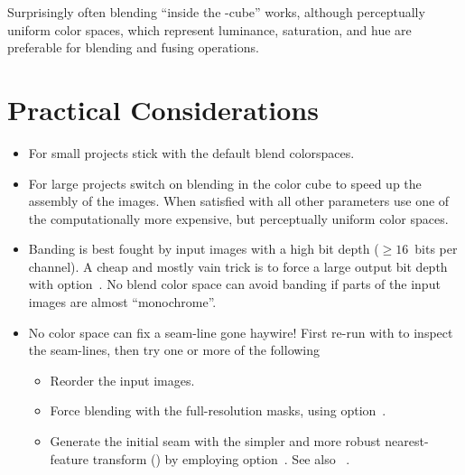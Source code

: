 \noindent Surprisingly often blending ``inside the -cube'' works, although
perceptually uniform color spaces, which represent luminance, saturation, and hue are preferable
for blending and fusing operations.


\section[Practical Considerations]{\label{sec:practical-considerations}%
  Practical Considerations}

\begin{itemize}
\item
  For small projects stick with the default blend colorspaces.

\item
  For large projects switch on blending in the  color cube to speed up the assembly
  of the images.  When satisfied with all other parameters use one of the computationally more
  expensive, but perceptually uniform color spaces.

\item
  Banding is best fought by input images with a high bit depth (\mbox{$\geq 16$ bits} per
  channel).  A cheap and mostly vain trick is to force a large output bit depth with
  option~.  No blend color space can avoid banding if
  parts of the input images are almost ``monochrome''.

\ifenblend
  \item
     No color space can fix a seam-line gone
    haywire!  First re-run  with
     to inspect the seam-lines, then try one
    or more of the following

    \begin{itemize}
    \item
      Reorder the input images.

    \item
      Force blending with the full-resolution masks, using
      option~.

    \item
      Generate the initial seam with the simpler and more robust nearest\hyp feature transform
      () by employing option~.  See also
      \chapterName~.


\end{itemize}
\end{itemize}
